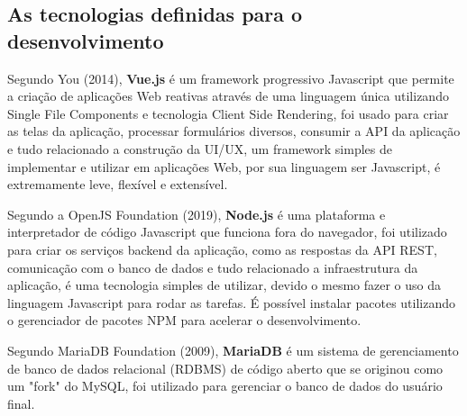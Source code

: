 \subsection{As tecnologias definidas para o desenvolvimento}
Segundo You (2014), \textbf{Vue.js} é um framework progressivo Javascript que permite a criação de aplicações Web reativas através de uma linguagem única utilizando Single File Components e tecnologia Client Side Rendering, foi usado para criar as telas da aplicação, processar formulários diversos, consumir a API da aplicação e tudo relacionado a construção da UI/UX, um framework simples de implementar e utilizar em aplicações Web, por sua linguagem ser Javascript, é extremamente leve, flexível e extensível. 

Segundo a OpenJS Foundation (2019), \textbf{Node.js} é uma plataforma e interpretador de código Javascript que funciona fora do navegador, foi utilizado para criar os serviços backend da aplicação, como as respostas da API REST, comunicação com o banco de dados e tudo relacionado a infraestrutura da aplicação, é uma tecnologia simples de utilizar, devido o mesmo fazer o uso da linguagem Javascript para rodar as tarefas. É possível instalar pacotes utilizando o gerenciador de pacotes NPM para acelerar o desenvolvimento.

Segundo MariaDB Foundation (2009), \textbf{MariaDB} é um sistema de gerenciamento de banco de dados relacional (RDBMS) de código aberto que se originou como um "fork" do MySQL,  foi utilizado para gerenciar o banco de dados do usuário final.
